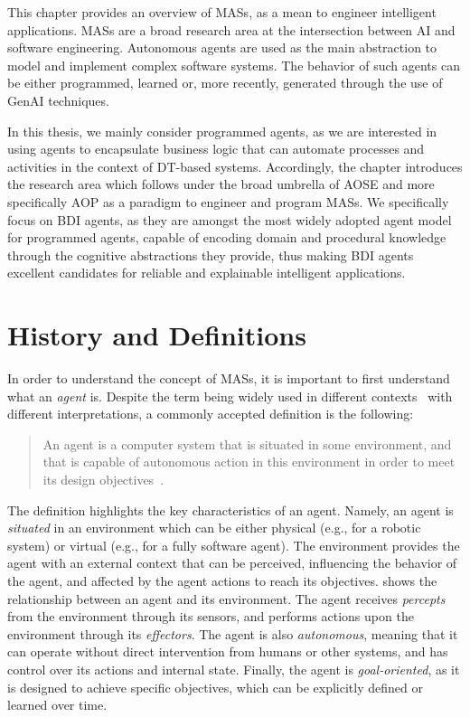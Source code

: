 This chapter provides an overview of \acp{MAS}, as a mean to engineer intelligent applications.
%
\acp{MAS} are a broad research area at the intersection between \ac{AI} and software engineering.
%
Autonomous agents are used as the main abstraction to model and implement complex software systems. The behavior of such agents can be either programmed, learned or, more recently, generated through the use of \ac{GenAI} techniques. 

In this thesis, we mainly consider programmed agents, as we are interested in using agents to encapsulate business logic that can automate processes and activities in the context of \ac{DT}-based systems. 
%
Accordingly, the chapter introduces the research area which follows under the broad umbrella of \ac{AOSE} and more specifically \ac{AOP} as a paradigm to engineer and program \acp{MAS}. 
%
We specifically focus on \ac{BDI} agents, as they are amongst the most widely adopted agent model for programmed agents, capable of encoding domain and procedural knowledge through the cognitive abstractions they provide, thus making \ac{BDI} agents excellent candidates for reliable and explainable intelligent applications. 

\section{History and Definitions}

In order to understand the concept of \acp{MAS}, it is important to first understand what an \emph{agent} is.
%
Despite the term being widely used in different contexts~\cite{wooldridge1995ker} with different interpretations, a commonly accepted definition is the following:

\begin{quote}
    An agent is a computer system that is situated in some environment,
    and that is capable of autonomous action in this environment in order
    to meet its design objectives~\cite{2009wooldridge}.
\end{quote}

The definition highlights the key characteristics of an agent. 
%
Namely, an agent is \emph{situated} in an environment which can be either physical (e.g., for a robotic system) or virtual (e.g., for a fully software agent).
%
The environment provides the agent with an external context that can be perceived, influencing the behavior of the agent, and affected by the agent actions to reach its objectives.
%
 shows the relationship between an agent and its environment. The agent receives \emph{percepts} from the environment through its sensors, and performs actions upon the environment through its \emph{effectors}.
%
The agent is also \emph{autonomous}, meaning that it can operate without direct intervention from humans or other systems, and has control over its actions and internal state.
%
Finally, the agent is \emph{goal-oriented}, as it is designed to achieve specific objectives, which can be explicitly defined or learned over time.

